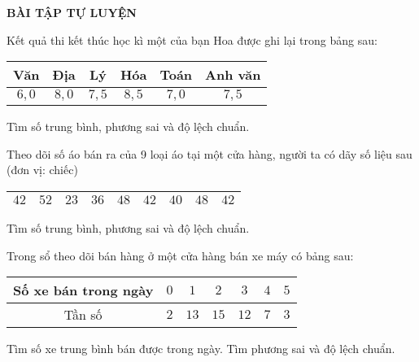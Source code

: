 \begin{center}
	\textbf{BÀI TẬP TỰ LUYỆN}
	\begin{bt}%
		Kết quả thi kết thúc học kì một của bạn Hoa được ghi lại trong bảng sau:
		\begin{center}
			\begin{tabular}{|c|c|c|c|c|c|}
				\hline 
				Văn & Địa & Lý & Hóa & Toán & Anh văn \\ 
				\hline 
				$6,0$ & $8,0$ & $7,5$ & $8,5$ & $7,0$ & $7,5$ \\ 
				\hline 
			\end{tabular} 
		\end{center}
		Tìm số trung bình, phương sai và độ lệch chuẩn.
	\end{bt}
\end{center}
\begin{bt}%
	Theo dõi số áo bán ra của 9 loại áo tại một cửa hàng, người ta có dãy số liệu sau (đơn vị: chiếc)
	\begin{center}
		\begin{tabular}{|c|c|c|c|c|c|c|c|c|}
			\hline 
			$42$ & $52$& $23$ & $36$ & $48$ & $42$ & $40$ & $48$ & $42$ \\ 
			\hline 
		\end{tabular} 
	\end{center}
	Tìm số trung bình, phương sai và độ lệch chuẩn.
\end{bt}
\begin{bt}%
	Trong sổ theo dõi bán hàng ở một cửa hàng bán xe máy có bảng sau:
	\begin{center}
		\begin{tabular}{|c|c|c|c|c|c|c|}
			\hline 
			Số xe bán trong ngày & $0$ & $1$ & $2$ & $3$ & $4$ & $5$ \\ 
			\hline 
			Tần số & $2$ & $13$ & $15$ & $12$ & $7$ & $3$\\ 
			\hline 
		\end{tabular} 
	\end{center}
	Tìm số xe trung bình bán được trong ngày. Tìm phương sai và độ lệch chuẩn.
\end{bt}


